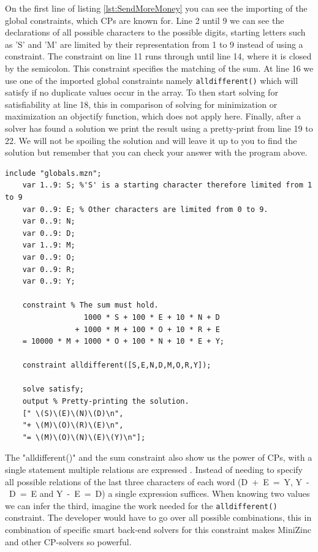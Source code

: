 \label{sendMoreMoneyExplanation}
On the first line of listing \ref{lst:SendMoreMoney} you can see the importing of the global constraints, which CPs are known for. Line 2 until 9 we can see the declarations of all possible characters to the possible digits, starting letters such as 'S' and 'M' are limited by their representation from 1 to 9 instead of using a constraint. The constraint on line 11 runs through until line 14, where it is closed by the semicolon. This constraint specifies the matching of the sum. At line 16 we use one of the imported global constraints namely \texttt{alldifferent()} which will satisfy if no duplicate values occur in the array. To then start solving for satisfiability at line 18, this in comparison of solving for minimization or maximization an objectify function, which does not apply here. Finally, after a solver has found a solution we print the result using a pretty-print from line 19 to 22.
We will not be spoiling the solution and will leave it up to you to find the solution but remember that you can check your answer with the program above.

\begin{minipage}{0.948\textwidth}
\begin{lstlisting}[language=minizinc, label={lst:SendMoreMoney}, caption={Solution to the puzzle "send more money" modified and taken from \url{https://www.minizinc.org/doc-2.5.5/en/downloads/send-more-money.mzn}.}]
	include "globals.mzn";
	var 1..9: S; %'S' is a starting character therefore limited from 1 to 9
	var 0..9: E; % Other characters are limited from 0 to 9.
	var 0..9: N;
	var 0..9: D;
	var 1..9: M;
	var 0..9: O;
	var 0..9: R;
	var 0..9: Y;
	
	constraint % The sum must hold.
                  1000 * S + 100 * E + 10 * N + D
                + 1000 * M + 100 * O + 10 * R + E
    = 10000 * M + 1000 * O + 100 * N + 10 * E + Y;
	
	constraint alldifferent([S,E,N,D,M,O,R,Y]);
	
	solve satisfy;
	output % Pretty-printing the solution.
	[" \(S)\(E)\(N)\(D)\n",
	"+ \(M)\(O)\(R)\(E)\n",
	"= \(M)\(O)\(N)\(E)\(Y)\n"];
\end{lstlisting}
\end{minipage}


The "alldifferent()" and the sum constraint also show us the power of CPs, with a single statement multiple relations are expressed \cite{53marriott1998programming}. Instead of needing to specify all possible relations of the last three characters of each word (\mbox{D + E = Y}, \mbox{Y - D = E} and \mbox{Y - E = D}) a single expression suffices. When knowing two values we can infer the third, imagine the work needed for the \texttt{alldifferent()} constraint. The developer would have to go over all possible combinations, this in combination of specific smart back-end solvers for this constraint makes MiniZinc and other CP-solvers so powerful. 

